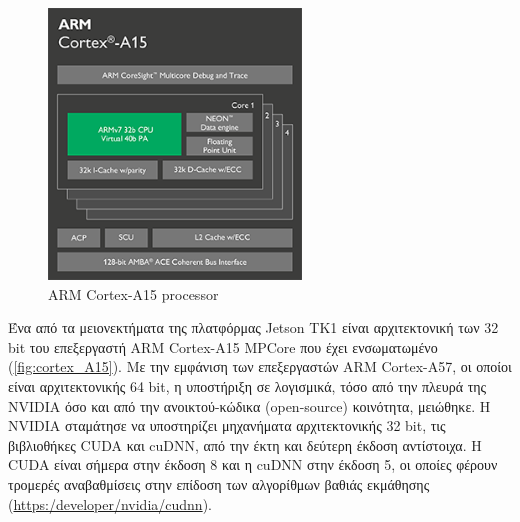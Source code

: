 \begin{figure}[!ht]
  \centering
  \includegraphics[width=0.6\textwidth]{./images/chapter4/cortex_A15_chip_diagram.png}
  \caption[ARM Cortex-A15 processor]{ARM Cortex-A15 processor}
  \label{fig:cortex_A15}
\end{figure}

Ένα από τα μειονεκτήματα της πλατφόρμας Jetson TK1 είναι αρχιτεκτονική των 32 bit του επεξεργαστή ARM Cortex-A15 MPCore
που έχει ενσωματωμένο (\autoref{fig:cortex_A15}). Με την εμφάνιση των επεξεργαστών ARM Cortex-A57, οι οποίοι είναι αρχιτεκτονικής 64 bit,
η υποστήριξη σε λογισμικά, τόσο από την πλευρά της NVIDIA όσο και από την ανοικτού-κώδικα (open-source) κοινότητα, μειώθηκε.
Η NVIDIA σταμάτησε να υποστηρίζει μηχανήματα αρχιτεκτονικής 32 bit, τις βιβλιοθήκες CUDA και cuDNN,
από την έκτη και δεύτερη έκδοση αντίστοιχα. Η CUDA είναι σήμερα στην έκδοση 8 και η cuDNN στην έκδοση 5,
οι οποίες φέρουν τρομερές αναβαθμίσεις στην επίδοση των αλγορίθμων βαθιάς εκμάθησης \\
(\href{https:/developer/nvidia/cudnn}{https:/developer/nvidia/cudnn}).
